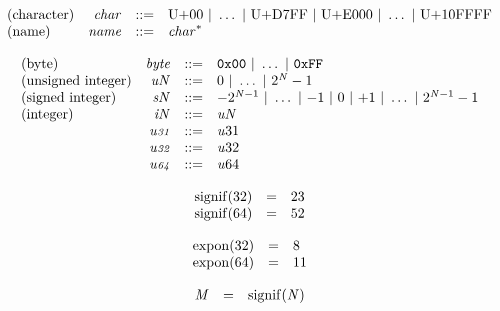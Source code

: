 \vspace{1ex}

$$
\begin{array}{@{}lrrl@{}l@{}}
\mbox{(character)} & {\mathit{char}} &::=& \mathrm{U{+}00} ~|~ \dots ~|~ \mathrm{U{+}D7FF} ~|~ \mathrm{U{+}E000} ~|~ \dots ~|~ \mathrm{U{+}10FFFF} \\
\mbox{(name)} & {\mathit{name}} &::=& {{\mathit{char}}^\ast} \\
\end{array}
$$

\vspace{1ex}

\vspace{1ex}

$$
\begin{array}{@{}lrrl@{}l@{}}
\mbox{(byte)} & {\mathit{byte}} &::=& \mathtt{0x00} ~|~ \dots ~|~ \mathtt{0xFF} \\
\mbox{(unsigned integer)} & {{\mathit{u}}}{{\mathit{N}}} &::=& 0 ~|~ \dots ~|~ {2^{{\mathit{N}}}} - 1 \\
\mbox{(signed integer)} & {{\mathit{s}}}{{\mathit{N}}} &::=& {-{2^{{\mathit{N}} - 1}}} ~|~ \dots ~|~ {-1} ~|~ 0 ~|~ {+1} ~|~ \dots ~|~ {2^{{\mathit{N}} - 1}} - 1 \\
\mbox{(integer)} & {{\mathit{i}}}{{\mathit{N}}} &::=& {{\mathit{u}}}{{\mathit{N}}} \\
& {\mathit{u{\scriptstyle31}}} &::=& {{\mathit{u}}}{31} \\
& {\mathit{u{\scriptstyle32}}} &::=& {{\mathit{u}}}{32} \\
& {\mathit{u{\scriptstyle64}}} &::=& {{\mathit{u}}}{64} \\
\end{array}
$$

\vspace{1ex}

$$
\begin{array}{@{}lcl@{}l@{}}
{\mathrm{signif}}(32) &=& 23 &  \\
{\mathrm{signif}}(64) &=& 52 &  \\
\end{array}
$$

$$
\begin{array}{@{}lcl@{}l@{}}
{\mathrm{expon}}(32) &=& 8 &  \\
{\mathrm{expon}}(64) &=& 11 &  \\
\end{array}
$$

$$
\begin{array}{@{}lcl@{}l@{}}
{\mathit{M}} &=& {\mathrm{signif}}({\mathit{N}}) &  \\
\end{array}
$$

